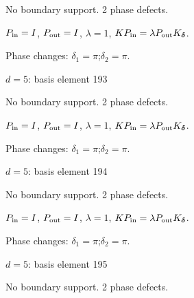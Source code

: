 No boundary support. 2 phase defects.
\begin{center}
\end{center}
\vspace{-1mm}
$P_{\rm in}=I$, \quad $P_{\rm out}=I$, \quad $\lambda=1$, \qquad $K P_{\rm in}=\lambda P_{\rm out}K_{\boldsymbol\delta}$.
\par\smallskip\begin{minipage}{.98\linewidth}\small Phase changes: $\delta_{1}=\pi$;\quad $\delta_{2}=\pi$.\end{minipage}
\vfill
{\footnotesize\texttt{}}
\newpage
{}
{\Large $d=5$: basis element 193}\par
No boundary support. 2 phase defects.
\begin{center}
\end{center}
\vspace{-1mm}
$P_{\rm in}=I$, \quad $P_{\rm out}=I$, \quad $\lambda=1$, \qquad $K P_{\rm in}=\lambda P_{\rm out}K_{\boldsymbol\delta}$.
\par\smallskip\begin{minipage}{.98\linewidth}\small Phase changes: $\delta_{1}=\pi$;\quad $\delta_{2}=\pi$.\end{minipage}
\vfill
{\footnotesize\texttt{}}
\newpage
{}
{\Large $d=5$: basis element 194}\par
No boundary support. 2 phase defects.
\begin{center}
\end{center}
\vspace{-1mm}
$P_{\rm in}=I$, \quad $P_{\rm out}=I$, \quad $\lambda=1$, \qquad $K P_{\rm in}=\lambda P_{\rm out}K_{\boldsymbol\delta}$.
\par\smallskip\begin{minipage}{.98\linewidth}\small Phase changes: $\delta_{1}=\pi$;\quad $\delta_{2}=\pi$.\end{minipage}
\vfill
{\footnotesize\texttt{}}
\newpage
{}
{\Large $d=5$: basis element 195}\par
No boundary support. 2 phase defects.
\begin{center}
\end{center}
